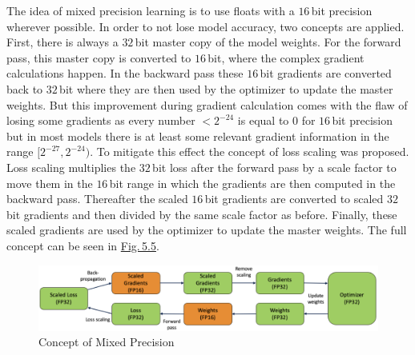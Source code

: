 The idea of mixed precision learning is to use floats with a $16$\,bit precision wherever possible. In order to not lose model accuracy, two concepts are applied. First, there is always a $32$\,bit master copy of the model weights. For the forward pass, this master copy is converted to $16$\,bit, where the complex gradient calculations happen. In the backward pass these $16$\,bit gradients are converted back to $32$\,bit where they are then used by the optimizer to update the master weights. But this improvement during gradient calculation comes with the flaw of losing some gradients as every number $<2^{-24}$ is equal to $0$ for $16$\,bit precision but in most models there is at least some relevant gradient information in the range $[2^{-27},2^{-24})$. To mitigate this effect the concept of loss scaling was proposed. Loss scaling multiplies the $32$\,bit loss after the forward pass by a scale factor to move them in the $16$\,bit range in which the gradients are then computed in the backward pass. Thereafter the scaled $16$\,bit gradients are converted to scaled $32$\,bit gradients and then divided by the same scale factor as before. Finally, these scaled gradients are used by the optimizer to update the master weights. The full concept can be seen in \hyperref[fig:5.5]{Fig.\,5.5}.
%
\begin{figure}[] \label{fig:5.5}
    \centering
    \includegraphics[width=.9\textwidth]{Chapters/figures/mixed_prec.PNG}
    \caption{Concept of Mixed Precision}
\end{figure}
%

